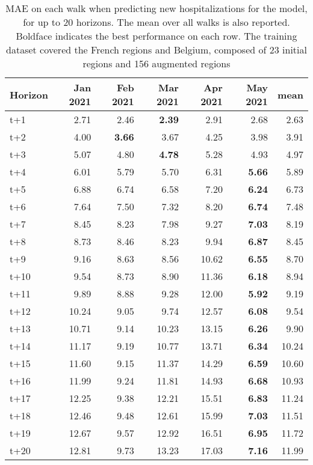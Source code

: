 \begin{table}[H]
\centering
\caption{MAE on each walk when predicting new hospitalizations for the model, for up to 20 horizons. The mean over all walks is also reported. Boldface indicates the best performance on each row. The training dataset covered the French regions and Belgium, composed of 23 initial regions and 156 augmented regions }
\label{tab:MAE_walk_baseline}
\begin{tabular}{lrrrrrr}
\toprule
Horizon &  Jan 2021 &  Feb 2021 &  Mar 2021 &  Apr 2021 &  May 2021 &  mean \\
\midrule
t+1  & 2.71  & 2.46  & \textbf{2.39}  & 2.91  & 2.68  & 2.63  \\
t+2  & 4.00  & \textbf{3.66}  & 3.67  & 4.25  & 3.98  & 3.91  \\
t+3  & 5.07  & 4.80  & \textbf{4.78}  & 5.28  & 4.93  & 4.97  \\
t+4  & 6.01  & 5.79  & 5.70  & 6.31  & \textbf{5.66}  & 5.89  \\
t+5  & 6.88  & 6.74  & 6.58  & 7.20  & \textbf{6.24}  & 6.73  \\
t+6  & 7.64  & 7.50  & 7.32  & 8.20  & \textbf{6.74}  & 7.48  \\
t+7  & 8.45  & 8.23  & 7.98  & 9.27  & \textbf{7.03}  & 8.19  \\
t+8  & 8.73  & 8.46  & 8.23  & 9.94  & \textbf{6.87}  & 8.45  \\
t+9  & 9.16  & 8.63  & 8.56  & 10.62  & \textbf{6.55}  & 8.70  \\
t+10  & 9.54  & 8.73  & 8.90  & 11.36  & \textbf{6.18}  & 8.94  \\
t+11  & 9.89  & 8.88  & 9.28  & 12.00  & \textbf{5.92}  & 9.19  \\
t+12  & 10.24  & 9.05  & 9.74  & 12.57  & \textbf{6.08}  & 9.54  \\
t+13  & 10.71  & 9.14  & 10.23  & 13.15  & \textbf{6.26}  & 9.90  \\
t+14  & 11.17  & 9.19  & 10.77  & 13.71  & \textbf{6.34}  & 10.24  \\
t+15  & 11.60  & 9.15  & 11.37  & 14.29  & \textbf{6.59}  & 10.60  \\
t+16  & 11.99  & 9.24  & 11.81  & 14.93  & \textbf{6.68}  & 10.93  \\
t+17  & 12.25  & 9.38  & 12.21  & 15.51  & \textbf{6.83}  & 11.24  \\
t+18  & 12.46  & 9.48  & 12.61  & 15.99  & \textbf{7.03}  & 11.51  \\
t+19  & 12.67  & 9.57  & 12.92  & 16.51  & \textbf{6.95}  & 11.72  \\
t+20  & 12.81  & 9.73  & 13.23  & 17.03  & \textbf{7.16}  & 11.99  \\

\bottomrule
\end{tabular}
\end{table}
